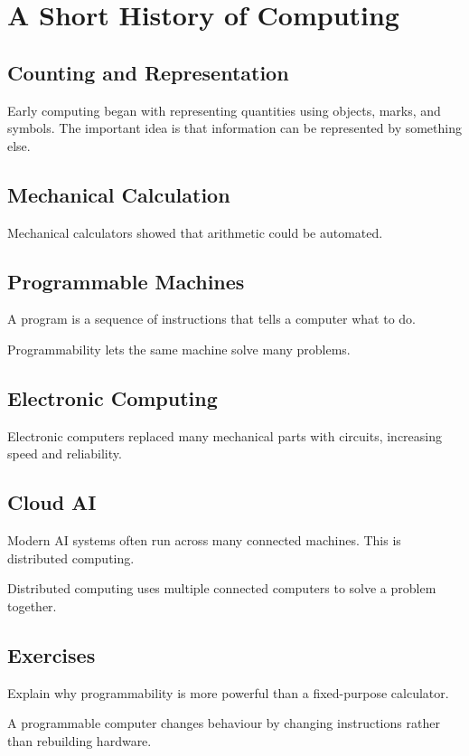 \chapter{A Short History of Computing}
\label{chap:history-of-computing}
\section{Counting and Representation}Early computing began with representing quantities using objects, marks, and symbols. The important idea is that information can be represented by something else.
\section{Mechanical Calculation}Mechanical calculators showed that arithmetic could be automated.
\section{Programmable Machines}\begin{definition}A program is a sequence of instructions that tells a computer what to do.\end{definition}
Programmability lets the same machine solve many problems.
\section{Electronic Computing}Electronic computers replaced many mechanical parts with circuits, increasing speed and reliability.
\section{Cloud AI}Modern AI systems often run across many connected machines. This is distributed computing.
\begin{definition}Distributed computing uses multiple connected computers to solve a problem together.\end{definition}
\section{Exercises}\begin{exercise}Explain why programmability is more powerful than a fixed-purpose calculator.\end{exercise}\begin{solution}A programmable computer changes behaviour by changing instructions rather than rebuilding hardware.\end{solution}
